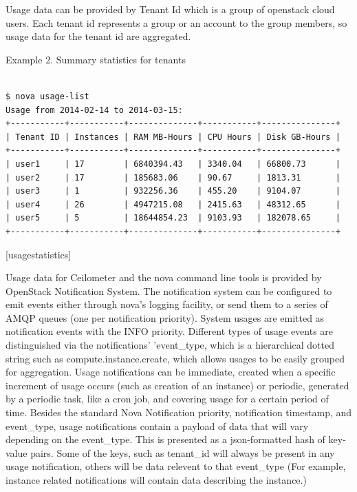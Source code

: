 \documentclass{sig-alternate}
\begin{document}
Usage data can be provided by Tenant Id which is a group of openstack cloud users. Each tenant id represents a group or an account to the group members, so usage data for the tenant id are aggregated.

\newline

Example 2. Summary statistics for tenants

\begin{lstlisting}

$ nova usage-list
Usage from 2014-02-14 to 2014-03-15:
+-----------+-----------+--------------+-----------+---------------+
| Tenant ID | Instances | RAM MB-Hours | CPU Hours | Disk GB-Hours |
+-----------+-----------+--------------+-----------+---------------+
| user1     | 17        | 6840394.43   | 3340.04   | 66800.73      |
| user2     | 17        | 185683.06    | 90.67     | 1813.31       |
| user3     | 1         | 932256.36    | 455.20    | 9104.07       |
| user4     | 26        | 4947215.08   | 2415.63   | 48312.65      |
| user5     | 5         | 18644854.23  | 9103.93   | 182078.65     |
+-----------+-----------+--------------+-----------+---------------+

\end{lstlisting}

[usagestatistics]

Usage data for Ceilometer and the nova command line tools is provided by OpenStack Notification System. The notification system can be configured to emit events either through nova's logging facility, or send them to a series of AMQP queues (one per notification priority). System usages are emitted as notification events with the INFO priority. Different types of usage events are distinguished via the notifications' 'event\_type, which is a hierarchical dotted string such as compute.instance.create, which allows usages to be easily grouped for aggregation. Usage notifications can be immediate, created when a specific increment of usage occurs (such as creation of an instance) or periodic, generated by a periodic task, like a cron job, and covering usage for a certain period of time. Besides the standard Nova Notification priority, notification timestamp, and event\_type, usage notifications contain a payload of data that will vary depending on the event\_type. This is presented as a json-formatted hash of key-value pairs. Some of the keys, such as tenant\_id will always be present in any usage notification, others will be data relevent to that event\_type (For example, instance related notifications will contain data describing the instance.)
\end{document}
